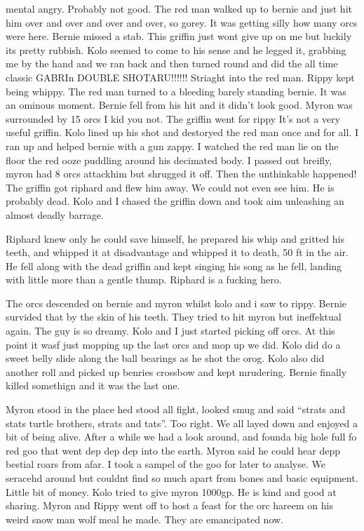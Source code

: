 mental angry. Probably not good. The red man walked up to bernie and just hit him over and over and over and over, so gorey. It was getting silly how many orcs were here. Bernie missed a stab. This griffin just wont give up on me but luckily its pretty rubbish. Kolo seemed to come to his sense and he legged it, grabbing me by the hand and we ran back and then turned round and did the all time classic GABRIn DOUBLE SHOTARU!!!!!! Striaght into the red man. Rippy kept being whippy. The red man turned to a bleeding barely standing bernie. It was an ominous moment. Bernie fell from his hit and it didn’t look good. Myron was surrounded by 15 orcs I kid you not. The griffin went for rippy It’s not a very useful griffin. Kolo lined up his shot and destoryed the red man once and for all. I ran up and helped bernie with a gun zappy. I watched the red man lie on the floor the red ooze puddling around his decimated body. I passed out breifly, myron had 8 orcs attackhim but shrugged it off. Then the unthinkable happened! The griffin got riphard and flew him away. We could not even see him. He is probably dead. Kolo and I chased the griffin down and took aim unleashing an almost deadly barrage.\medskip

Riphard knew only he could save himself, he prepared his whip and gritted his teeth, and whipped it at disadvantage and whipped it to death, 50 ft in the air. He fell along with the dead griffin and kept singing his song as he fell, landing with little more than a gentle thump. Riphard is a fucking hero.\medskip

The orcs descended on bernie and myron whilst kolo and i saw to rippy. Bernie survided that by the skin of his teeth. They tried to hit myron but ineffektual again. The guy is so dreamy. Kolo and I just started picking off orcs. At this point it wasf just mopping up the last orcs and mop up we did. Kolo did do a sweet belly slide along the ball bearings as he shot the orog. Kolo also did another roll and picked up benries crossbow and kept mrudering. Bernie finally killed somethign and it was the last one.\medskip

Myron stood in the place hed stood all fight, looked smug and said “strats and stats turtle brothers, strats and tats”. Too right. We all layed down and enjoyed a bit of being alive. After a while we had a look around, and founda big hole full fo red goo that went dep dep dep into the earth. Myron said he could hear depp bestial roars from afar. I took a sampel of the goo for later to analyse. We seracehd around but couldnt find so much apart from bones and basic equipment. Little bit of money. Kolo tried to give myron 1000gp. He is kind and good at sharing. Myron and Rippy went off to host a feast for the orc hareem on his weird snow man wolf meal he made. They are emancipated now.\medskip

